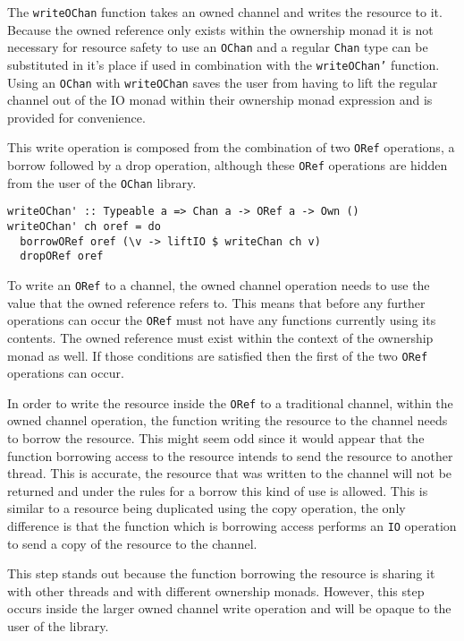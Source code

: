 \documentclass[onehalf,11pt]{beavtex}
\begin{document}
The \texttt{writeOChan} function takes an owned channel and writes the
resource to it. Because the owned reference only exists within the
ownership monad it is not necessary for resource safety to use
an \texttt{OChan} and a regular \texttt{Chan} type can be substituted
in it's place if used in combination with the \texttt{writeOChan'} function.
Using an \texttt{OChan} with \texttt{writeOChan} saves the user
from having to lift the regular channel out of the IO monad within their
ownership monad expression and is provided for convenience.

This write operation is composed from the combination of two
\texttt{ORef} operations, a borrow followed by a drop operation, 
although these \texttt{ORef} operations are hidden from the user of the
\texttt{OChan} library.

\begin{verbatim}
writeOChan' :: Typeable a => Chan a -> ORef a -> Own ()
writeOChan' ch oref = do
  borrowORef oref (\v -> liftIO $ writeChan ch v)
  dropORef oref
\end{verbatim}

To write an \texttt{ORef} to a channel, the owned channel operation
needs to use the value that the owned reference refers to.  This means
that before any further operations can occur the \texttt{ORef} must not have any
functions currently using its contents. The owned reference must exist within
the context of the ownership monad as well.
If those conditions are satisfied then the first of the two \texttt{ORef}
operations can occur.

In order to write the resource inside the \texttt{ORef} to a traditional
channel, within the owned channel operation, the function writing the resource
to the channel needs to borrow the resource.
This might seem odd since it would appear that the function borrowing access
to the resource intends to send the resource to another thread.
This is accurate, the resource that was written to the channel will not be
returned and under the rules for a borrow this kind of use is allowed.
This is similar to a resource being duplicated using the copy operation, the
only difference is that the function which is borrowing access 
performs an \texttt{IO} operation to send a copy of the resource to the
channel.

This step stands out because the function borrowing the resource is sharing
it with other threads and with different ownership monads.
However, this step occurs inside the larger owned channel write operation and will
be opaque to the user of the library.
\end{document}
